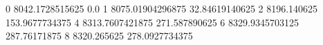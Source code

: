 0 8042.1728515625 0.0
1 8075.01904296875 32.84619140625
2 8196.140625 153.9677734375
4 8313.7607421875 271.587890625
6 8329.9345703125 287.76171875
8 8320.265625 278.0927734375
